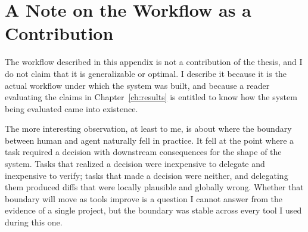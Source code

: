 \section{A Note on the Workflow as a Contribution}
\label{sec:ai-reflection}

The workflow described in this appendix is not a contribution of the thesis, and I do not claim that it is generalizable or optimal. I describe it because it is the actual workflow under which the system was built, and because a reader evaluating the claims in Chapter~\ref{ch:results} is entitled to know how the system being evaluated came into existence.

The more interesting observation, at least to me, is about where the boundary between human and agent naturally fell in practice. It fell at the point where a task required a decision with downstream consequences for the shape of the system. Tasks that realized a decision were inexpensive to delegate and inexpensive to verify; tasks that made a decision were neither, and delegating them produced diffs that were locally plausible and globally wrong. Whether that boundary will move as tools improve is a question I cannot answer from the evidence of a single project, but the boundary was stable across every tool I used during this one.
